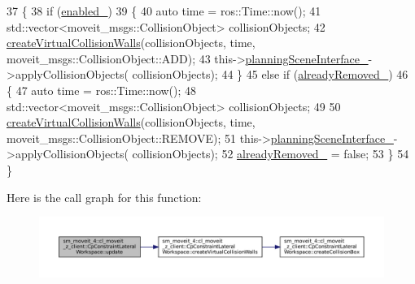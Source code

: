 \begin{DoxyCode}
37         \{
38             \textcolor{keywordflow}{if} (\hyperlink{classsm__moveit__4_1_1cl__moveit__z__client_1_1CpConstraintLateralWorkspace_a869220e440aadc79cf5213b6d27c1217}{enabled\_})
39             \{
40                 \textcolor{keyword}{auto} time = ros::Time::now();
41                 std::vector<moveit\_msgs::CollisionObject> collisionObjects;
42                 \hyperlink{classsm__moveit__4_1_1cl__moveit__z__client_1_1CpConstraintLateralWorkspace_abb413c4d73a4f6c7f2feca86624b5c7a}{createVirtualCollisionWalls}(collisionObjects, time, 
      moveit\_msgs::CollisionObject::ADD);
43                 this->\hyperlink{classsm__moveit__4_1_1cl__moveit__z__client_1_1CpConstraintLateralWorkspace_a39ac03e23023aef4e90f6bdd2ea41f75}{planningSceneInterface\_}->applyCollisionObjects(
      collisionObjects);
44             \}
45             \textcolor{keywordflow}{else} \textcolor{keywordflow}{if} (\hyperlink{classsm__moveit__4_1_1cl__moveit__z__client_1_1CpConstraintLateralWorkspace_a9d195448b13cc11a2043197ee4885e05}{alreadyRemoved\_})
46             \{
47                 \textcolor{keyword}{auto} time = ros::Time::now();
48                 std::vector<moveit\_msgs::CollisionObject> collisionObjects;
49 
50                 \hyperlink{classsm__moveit__4_1_1cl__moveit__z__client_1_1CpConstraintLateralWorkspace_abb413c4d73a4f6c7f2feca86624b5c7a}{createVirtualCollisionWalls}(collisionObjects, time, 
      moveit\_msgs::CollisionObject::REMOVE);
51                 this->\hyperlink{classsm__moveit__4_1_1cl__moveit__z__client_1_1CpConstraintLateralWorkspace_a39ac03e23023aef4e90f6bdd2ea41f75}{planningSceneInterface\_}->applyCollisionObjects(
      collisionObjects);
52                 \hyperlink{classsm__moveit__4_1_1cl__moveit__z__client_1_1CpConstraintLateralWorkspace_a9d195448b13cc11a2043197ee4885e05}{alreadyRemoved\_} = \textcolor{keyword}{false};
53             \}
54         \}
\end{DoxyCode}
Here is the call graph for this function\+:
\nopagebreak
\begin{figure}[H]
\begin{center}
\leavevmode
\includegraphics[width=350pt]{classsm__moveit__4_1_1cl__moveit__z__client_1_1CpConstraintLateralWorkspace_a1b96546a90ecd3ce10a73b65ff5fcf35_cgraph}
\end{center}
\end{figure}
